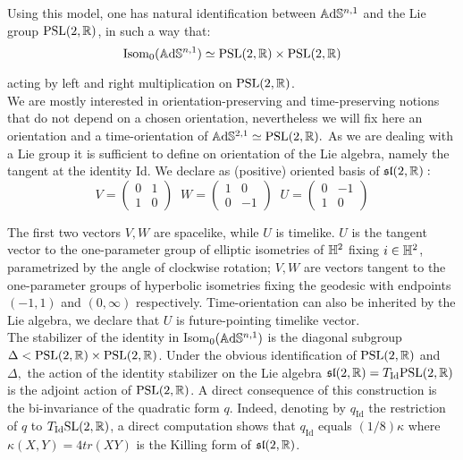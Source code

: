 Using this model, one has natural identification between $\mathbb{A}\mathrm{d}\mathbb{S}^{n,1}$ and the Lie group $\text{PSL}(2,\mathbb{R})$, in such a way that: 
\begin{equation}\label{isomiso}
    \text{Isom}_0(\mathbb{A}\mathrm{d}\mathbb{S}^{n,1})\simeq \text{PSL}(2,\mathbb{R})\times\text{PSL}(2,\mathbb{R})
\end{equation}
    
acting by left and right multiplication on $\text{PSL}(2,\mathbb{R})$.\\ We are mostly interested in orientation-preserving and time-preserving notions that do not depend on a chosen orientation, nevertheless we will fix here an orientation and a time-orientation of $\mathbb{A}\mathrm{d}\mathbb{S}^{2,1}\simeq\text{PSL}(2,\mathbb{R}).$ As we are dealing with a Lie group it is sufficient to define on orientation of the Lie algebra, namely the tangent at the identity Id. We declare as (positive) oriented basis of $\mathfrak{sl}(2,\mathbb{R}):$ 
\[
V=\begin{pmatrix}
  0 & 1 \\ 1 & 0
\end{pmatrix}\;\;
W=\begin{pmatrix}
  1 & 0 \\ 0 & -1
\end{pmatrix}
\;\;
U=\begin{pmatrix}
  0 & -1 \\ 1 & 0
\end{pmatrix}
\]

The first two vectors $V,W$ are spacelike, while $U$ is timelike. $U$ is the tangent vector to the one-parameter group of elliptic isometries of $\mathbb{H}^2$ fixing $i\in\mathbb{H}^2$, parametrized by the angle of clockwise rotation; $V,W$ are vectors tangent to the one-parameter groups of hyperbolic isometries fixing the geodesic with endpoints $(-1,1)$ and $(0,\infty)$ respectively. Time-orientation can also be inherited by the Lie algebra, we declare that $U$ is future-pointing timelike vector. \\

The stabilizer of the identity in Isom$_0(\mathbb{A}\mathrm{d}\mathbb{S}^{n,1})$ is the diagonal subgroup $\Delta<\text{PSL}(2,\mathbb{R})\times\text{PSL}(2,\mathbb{R})$. Under the obvious identification of $\text{PSL}(2,\mathbb{R})$ and $\Delta,$ the action of the identity stabilizer on the Lie algebra $\mathfrak{sl}(2,\mathbb{R})=T_{\text{Id}}\text{PSL}(2,\mathbb{R})$ is the adjoint action of $\text{PSL}(2,\mathbb{R})$. A direct consequence of this construction is the bi-invariance of the quadratic form $q$. Indeed, denoting by $q_{\text{Id}}$ the restriction of $q$ to $T_{\text{Id}}\text{SL}(2,\mathbb{R})$, a direct computation shows that $q_\text{Id}$ equals $(1/8)\kappa$ where $\kappa(X,Y)=4tr(XY)$ is the Killing form of $\mathfrak{sl}(2, \mathbb{R})$.

